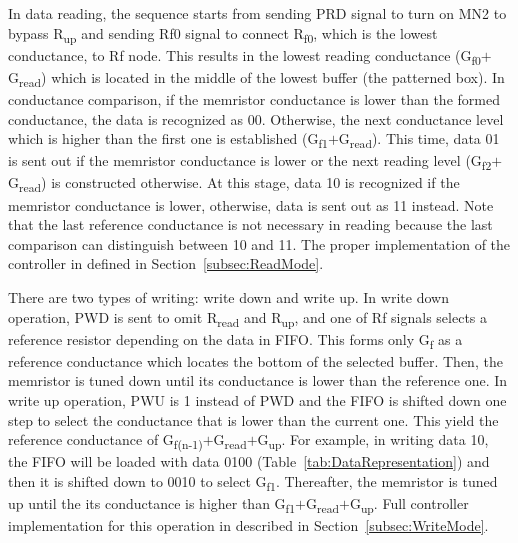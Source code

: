 \documentclass[twocolumn,conference]{IEEEtran}
\begin{document}
In data reading, the sequence starts from sending PRD signal to turn on MN2 to bypass R\textsubscript{up} and sending Rf0 signal to connect R\textsubscript{f0}, which is the lowest conductance, to Rf node. This results in the lowest reading conductance (G\textsubscript{f0}$+$G\textsubscript{read}) which is located in the middle of the lowest buffer (the patterned box). In conductance comparison, if the memristor conductance is lower than the formed conductance, the data is recognized as 00. Otherwise, the next conductance level which is higher than the first one is established (G\textsubscript{f1}$+$G\textsubscript{read}). This time, data 01 is sent out if the memristor conductance is lower or the next reading level (G\textsubscript{f2}$+$G\textsubscript{read}) is constructed otherwise. At this stage, data 10 is recognized if the memristor conductance is lower, otherwise, data is sent out as 11 instead. Note that the last reference conductance is not necessary in reading because the last comparison can distinguish between 10 and 11. The proper implementation of the controller in defined in Section~\ref{subsec:ReadMode}.

There are two types of writing: write down and write up. %
In write down operation, PWD is sent to omit R\textsubscript{read} and R\textsubscript{up}, and one of Rf signals selects a reference resistor depending on the data in FIFO. This forms only G\textsubscript{f} as a reference conductance which locates the bottom of the selected buffer. Then, the memristor is tuned down until its conductance is lower than the reference one. In write up operation, PWU is 1 instead of PWD and the FIFO is shifted down one step to select the conductance that is lower than the current one. This yield the reference conductance of G\textsubscript{f(n-1)}$+$G\textsubscript{read}$+$G\textsubscript{up}. For example, in writing data 10, the FIFO will be loaded with data 0100 (Table~\ref{tab:DataRepresentation}) and then it is shifted down to 0010 to select G\textsubscript{f1}. Thereafter, the memristor is tuned up until the its conductance is higher than G\textsubscript{f1}$+$G\textsubscript{read}$+$G\textsubscript{up}. Full controller implementation for this operation in described in Section~\ref{subsec:WriteMode}.
\end{document}
